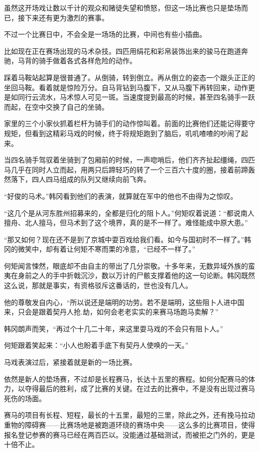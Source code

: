 虽然这开场戏让数以千计的观众和赌徒失望和愤怒，但这一场比赛也只是垫场而已，接下来还有更为激烈的赛事。 

不过一个比赛日中，不会全是一场场的比赛，中间也有些小插曲。 

比如现在正在赛场出现的马术杂技。四匹用绢花和彩帛装饰出来的骏马在跑道奔驰，马背的骑手做着各式各样危险的动作。 

踩着马鞍站起算是很普通了。从倒骑，转到倒立。再从倒立的姿态一个跟头正正的坐回马鞍。看着就是惊险万分。自马背钻到马腹下，又从马腹下再转回来，动作更是如同行云流水，马术惊人可见一斑。当速度提到最高的时候，甚至四名骑手一跃而起，在空中交换了自己的坐骑。 

家里的三个小家伙抓着栏杆为骑手们的动作惊叫着。前面的比赛他们还能记得要守规矩，但看到这精彩马戏的时候，终于将规矩跑到了脑后，叽叽喳喳的吵闹了起来。 

当四名骑手驾驭着坐骑到了包厢前的时候，一声唿哨后，他们齐齐扯起缰绳，四匹马几乎在同时人立而起，用两只后蹄轻巧的转了一个三百六十度的圈，接着前蹄轰然落下，四人四马组成的队列又继续向前飞奔。 

“好俊的马术。”韩冈看到他们的表演，就算就在军中的他也不由得为之惊叹。 

“这几个是从河东胜州招募来的，全都是归化的阻卜人。”何矩叹着说道：“都说南人擅舟、北人擅马，但马术到了这个境界，真的是不一样了。难怪能成中原大患。” 

“那又如何？现在还不是到了京城中耍百戏给我们看。如今与国初时不一样了。”韩冈的微笑中，却有着让何矩不寒而栗的冷意，“已经不一样了。” 

何矩闻言悚然，眼底却不由自主的带出了几分崇敬。十多年来，无数异域外族的蛮夷在身前之人的手中折戟沉沙，数以万计的尸骸支撑着他的这一句论断。韩冈既然这么说，那就是事实，有资格驳斥这番话的，世也没有几人。 

他的尊敬发自内心，“所以说还是端明的功劳。若不是端明，这些阻卜人进中国来，只会是跟着契丹人抢.劫，如何会老老实实的来赛马场跑马卖解？” 

韩冈朗声而笑，“再过个十几二十年，来这里耍马戏的不会只有阻卜人。” 

何矩跟着笑起来：“小人也盼着手底下有契丹人使唤的一天。” 

马戏表演过后，紧接着就是新的一场比赛。 

依然是新人的垫场赛，不过却是长程赛马，长达十五里的赛程。如何分配赛马的体力，以夺得最后的胜利，成了比赛的关键。在过去的比赛中，不是没有出现过赛马死伤的场面。 

赛马的项目有长程、短程，最长的十五里，最短的三里，除此之外，还有挽马拉动重物的障碍赛——比赛场地是被跑道环绕的赛场中央——这么多的比赛项目，使得报名登记参赛的赛马已经在两百匹以。没能通过基础测试，而被拒之门外的，更是十倍不止。 

